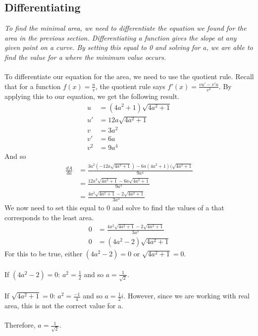 \documentclass[a4paper,11pt]{article}
\theoremstyle{definition}
\begin{document}
\subsection{Differentiating}
\textit{To find the minimal area, we need to differentiate the equation we found for the area in the previous section. Differentiating a function gives the slope at any given point on a curve. By setting this equal to 0 and solving for a, we are able to find the value for a where the minimum value occurs.}\\
\\To differentiate our equation for the area, we need to use the quotient rule. Recall that for a function $f(x)=\frac{u}{v}$, the quotient rule says $f'(x)=\frac{vu'-v'u}{v^2}$. By applying this to our equation, we get the following result. 
\begin{align*}
    u&=(4a^2+1)\sqrt{4a^2+1}\\
    u'&=12a\sqrt{4a^2+1}\\
    v&=3a^2\\
    v'&=6a\\
    v^2&=9a^4
\end{align*}
And so
\begin{align*}
    \frac{dA}{da}&=\frac{3a^2(-12a\sqrt{4a^2+1})-6a(4a^2+1)(\sqrt{4a^2+1}}{9a^4}\\
    &=\frac{12a^3\sqrt{4a^2+1}-6a\sqrt{4a^2+1}}{9a^4}\\
    &=\frac{4a^2\sqrt{4a^2+1}-2\sqrt{4a^2+1}}{3a^3}
\end{align*}
We now need to set this equal to 0 and solve to find the values of a that corresponds to the least area. 
\begin{align*}
    0&=\frac{4a^2\sqrt{4a^2+1}-2\sqrt{4a^2+1}}{3a^3}\\
    0&=(4a^2-2)\sqrt{4a^2+1}
\end{align*}
For this to be true, either $(4a^2-2)=0$ or $\sqrt{4a^2+1}=0$.\\
\\If $(4a^2-2)=0$: $a^2=\frac{1}{2}$ and so $a=\frac{1}{\sqrt{2}}$.\\
\\If $\sqrt{4a^2+1}=0$: $a^2=\frac{-1}{4}$ and so $a=\frac{1}{2}i$. However, since we are working with real area, this is not the correct value for a.\\
\\Therefore, $a=\frac{1}{\sqrt{2}}$.

\pagebreak
\end{document}
